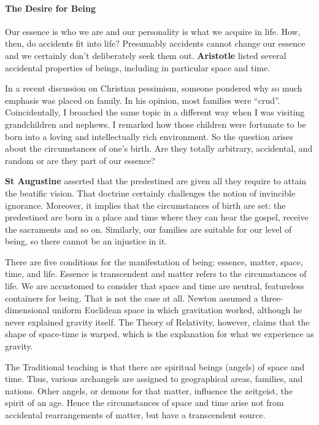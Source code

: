 \paragraph{The Desire for Being}


Our essence is who we are and our personality is what we acquire in life. How, then, do accidents fit into life? Presumably accidents cannot change our essence and we certainly don't deliberately seek them out. \textbf{Aristotle} listed several accidental properties of beings, including in particular space and time.

In a recent discussion on Christian pessimism, someone pondered why so much emphasis was placed on family. In his opinion, most families were ``crud''. Coincidentally, I broached the same topic in a different way when I was visiting grandchildren and nephews. I remarked how those children were fortunate to be born into a loving and intellectually rich environment. So the question arises about the circumstances of one's birth. Are they totally arbitrary, accidental, and random or are they part of our essence?

\textbf{St Augustine} asserted that the predestined are given all they require to attain the beatific vision. That doctrine certainly challenges the notion of invincible ignorance. Moreover, it implies that the circumstances of birth are set: the predestined are born in a place and time where they can hear the gospel, receive the sacraments and so on. Similarly, our families are suitable for our level of being, so there cannot be an injustice in it.

There are five conditions for the manifestation of being: essence, matter, space, time, and life. Essence is transcendent and matter refers to the circumstances of life. We are accustomed to consider that space and time are neutral, featureless containers for being. That is not the case at all. Newton assumed a three-dimensional uniform Euclidean space in which gravitation worked, although he never explained gravity itself. The Theory of Relativity, however, claims that the shape of space-time is warped, which is the explanation for what we experience as gravity.

The Traditional teaching is that there are spiritual beings (angels) of space and time. Thus, various archangels are assigned to geographical areas, families, and nations. Other angels, or demons for that matter, influence the zeitgeist, the spirit of an age. Hence the circumstances of space and time arise not from accidental rearrangements of matter, but have a transcendent source.



